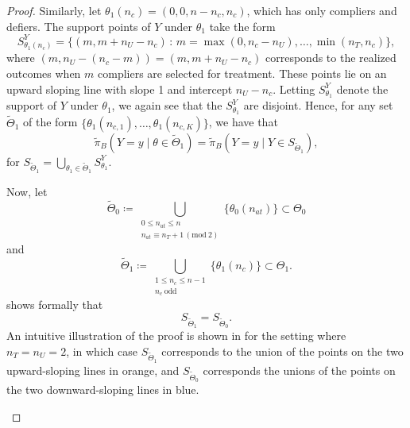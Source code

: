 \documentclass[12pt,reqno]{amsart}
\begin{document}
\begin{proof}
Similarly, let $\theta_1(n_c) = (0,0,n-n_{c},n_{c})$, which has only compliers and defiers. The support points of $Y$ under
$\theta_1$ take the form 
\begin{equation}
    S^Y_{\theta_1(n_{c})} = \{(m, m + n_U - n_c) \,:\,  m=\max(0, n_c - n_U),\ldots,\min
(n_T,n_c) \} , \label{eqn:s1} 
\end{equation}
where $(m,n_U-(n_c-m)) = (m,m + n_U - n_c)$ corresponds to the realized outcomes when $m$ compliers are selected for treatment. These points lie
on an upward sloping line with slope 1 and intercept $n_U - n_c$. 
Letting $S^{Y}_{\theta_1}$ denote
the support of $Y$ under $\theta_1$, we again see that the $S^{Y}_{\theta_1}$ are
disjoint. Hence, for any set $\tilde{\Theta}_1$ of the form $\{ \theta_1(n_{c,1}), \ldots, \theta_1(n_{c,K}) \}$, we have that $$\tilde{\pi}_{B}(Y=y \mid
\theta \in \tilde{\Theta}_1) = \tilde{\pi}_B( Y=y \mid Y \in
S_{\tilde{\Theta}_1}),$$ for $S_{\tilde{\Theta}_1} = \bigcup_{\theta_1 \in \tilde\Theta_1}
S^{Y}_{\theta_1}$.

Now, let  
\begin{equation}
\tilde\Theta_0 \coloneqq \bigcup_{\substack{0\le n_{at}\le n\\ n_{at}\equiv n_T+1\, (\mathrm{mod}\ 2)}} \{\theta_0(n_{at})\} \subset \Theta_0    \label{eqn:defTildeTheta0}
\end{equation}
and
\begin{equation}
 \tilde\Theta_1 \coloneqq \bigcup_{\substack{1\le n_c\le n-1\\ n_c\ \mathrm{odd}}} \{\theta_1(n_c)\} \subset \Theta_1. \label{eqn:defTildeTheta1}   
\end{equation}
 shows formally that \[
S_{\tilde{\Theta}_1} = S_{\tilde{\Theta}_0}. 
\]
\noindent An intuitive illustration of the proof is shown in  for the setting where $n_T=n_U=2$, in which case $S_{\tilde{\Theta}_1}$ corresponds to the union of the points on the two upward-sloping lines in orange, and $S_{\tilde{\Theta}_0}$ corresponds the unions of the points on the two downward-sloping lines in blue.

\begin{figure}[!ht]
    \centering
\end{figure}
\end{proof}
\end{document}
